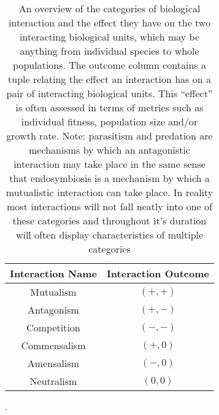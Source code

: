 \begin{table}[h]
    \begin{tabular}{|c|c|}
        \hline
        \textbf{Interaction Name} & \textbf{Interaction Outcome} \\ 
        \hline
        Mutualism               & \((+, +)\)  \\
        Antagonism              & \((+, -)\)  \\
        Competition             & \((-, -)\)  \\
        Commensalism            & \((+, 0)\)  \\
        Amensalism              & \((-, 0)\)  \\
        Neutralism              & \((0, 0)\)  \\ 
        \hline
    \end{tabular}
    \caption[Types of Biological Interaction]{An overview of the categories of biological interaction and the effect they have on the two interacting
        biological units, which may be anything from individual species to whole populations. The outcome column 
        contains a tuple relating the effect an interaction has on a pair of interacting biological units. 
        This ``effect'' is often assessed in terms of metrics such as individual fitness, population size and/or
        growth rate.
        Note: parasitism and predation are mechanisms by which an antagonistic interaction may take place \citep{Abrams1987}
        in the same sense that endosymbiosis is a mechanism by which a mutualistic interaction can take place.
        In reality most interactions will not fall neatly into one of these categories and throughout it's duration
        will often display characteristics of multiple categories \citep{Leung2008}}. 
   \label{tab:biointeractions}
\end{table}

